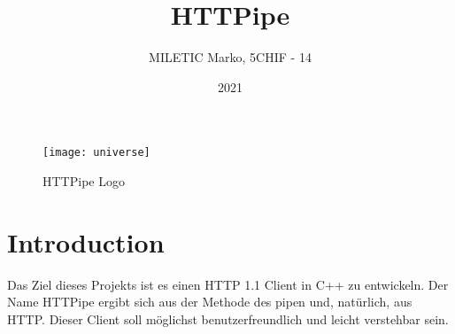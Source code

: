 \documentclass{article}
\title{HTTPipe}
\author{MILETIC Marko, 5CHIF - 14}
\date{2021}
\begin{document}
\maketitle

\begin{figure}[h!]
\centering
\texttt{[image: universe]}
\caption{HTTPipe Logo}
\label{fig:universe}
\end{figure}

\section{Introduction}
Das Ziel dieses Projekts ist es einen HTTP 1.1 Client in C++ zu entwickeln. Der Name HTTPipe ergibt sich aus der Methode des pipen und, natürlich, aus HTTP.
Dieser Client soll möglichst benutzerfreundlich und leicht verstehbar sein.



\end{document}
